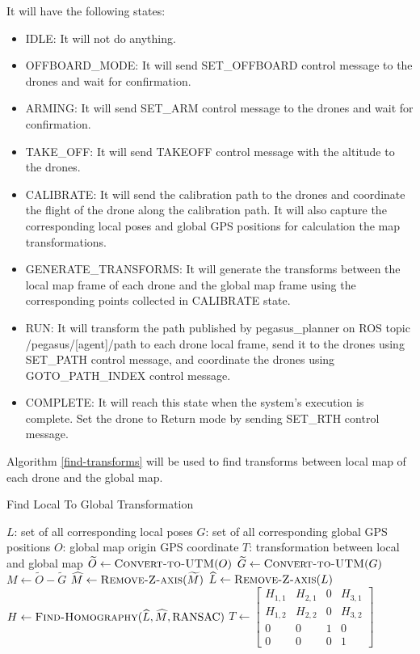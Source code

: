It will have the following states:
\begin{itemize}
  \item IDLE: It will not do anything.
  \item OFFBOARD\_MODE: It will send SET\_OFFBOARD control message to the drones and wait for confirmation.
  \item ARMING: It will send SET\_ARM control message to the drones and wait for confirmation.
  \item TAKE\_OFF: It will send TAKEOFF control message with the altitude to the drones.
  \item CALIBRATE: It will send the calibration path to the drones and coordinate the flight of the drone along the calibration path. It will also capture the corresponding local poses and global GPS positions for calculation the map transformations.
  \item GENERATE\_TRANSFORMS: It will generate the transforms between the local map frame of each drone and the global map frame using the corresponding points collected in CALIBRATE state.
  \item RUN: It will transform the path published by pegasus\_planner on ROS topic /pegasus/[agent]/path to each drone local frame, send it to the drones using SET\_PATH control message, and coordinate the drones using GOTO\_PATH\_INDEX control message.
  \item COMPLETE: It will reach this state when the system's execution is complete. Set the drone to Return mode by sending SET\_RTH control message.
\end{itemize}

Algorithm \ref{find-transforms} will be used to find transforms between local map of each drone and the global map.

\renewcommand{\algorithmicrequire}{\textbf{Input:}}
\renewcommand{\algorithmicensure}{\textbf{Output:}}
\renewcommand{\algorithmicforall}{\textbf{for each}}
\begin{algorithm}
  \caption{Find Local To Global Transformation}
  \label{find-transforms}
  \begin{algorithmic}
    \REQUIRE $L$: set of all corresponding local poses
    \REQUIRE $G$: set of all corresponding global GPS positions
    \REQUIRE $O$: global map origin GPS coordinate
    \ENSURE $T$: transformation between local and global map
    \STATE $\widetilde{O} \gets \textsc{Convert-to-UTM}(O)$
    \STATE $\widetilde{G} \gets \textsc{Convert-to-UTM}(G)$
    \STATE $M \gets \widetilde{O} - \widetilde{G}$
    \STATE $\widehat{M} \gets \textsc{Remove-Z-axis}(\widetilde{M})$
    \STATE $\widehat{L} \gets \textsc{Remove-Z-axis}(L)$
    \STATE $H \gets \textsc{Find-Homography}(\widehat{L}, \widehat{M}, \text{RANSAC})$
    \STATE $T \gets \begin{bmatrix}
      H_{1,1} & H_{2,1} & 0 & H_{3,1} \\
      H_{1,2} & H_{2,2} & 0 & H_{3,2} \\
      0 & 0 & 1 & 0 \\
      0 & 0 & 0 & 1
    \end{bmatrix}$

  \end{algorithmic}
\end{algorithm}

